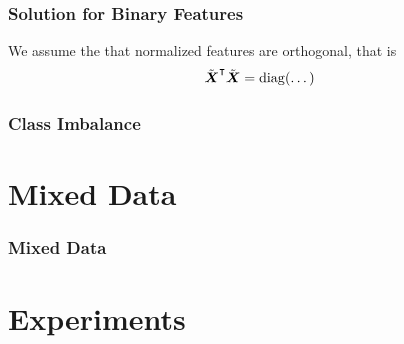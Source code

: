 \documentclass[10pt]{beamer}
\begin{document}
\begin{frame}[c]
  \frametitle{Solution for Binary Features}

  We assume the that normalized features are orthogonal, that is
  \[
    \tilde{\boldsymbol{X}}^\intercal \tilde{\boldsymbol{X}} = \operatorname{diag}(\dots)
  \]
\end{frame}

\begin{frame}[c]
  \frametitle{Class Imbalance}

\end{frame}

\section{Mixed Data}

\begin{frame}[c]
  \frametitle{Mixed Data}

\end{frame}

\section{Experiments}



% 
\end{document}
